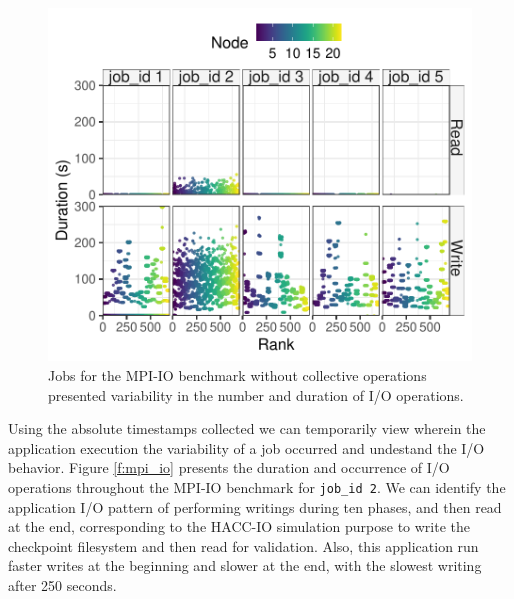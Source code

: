 \begin{figure}
	\centering
        \includegraphics[width=\linewidth]{figs/mpi_io_luster_no_coll_duration_allexperiments.pdf}
	\caption{Jobs for the MPI-IO benchmark without collective
          operations presented variability in the number and duration
          of I/O operations.}
	\label{f:mpi_io_all}
\end{figure}

Using the absolute timestamps collected we can temporarily view
wherein the application execution the variability of a job
occurred and undestand the I/O behavior. Figure \ref{f:mpi_io} presents the duration and occurrence of
I/O operations throughout the MPI-IO benchmark for \texttt{job\_id
  2}. We can identify the application I/O pattern of performing
writings during ten phases, and then read at the end, corresponding to the HACC-IO simulation purpose to write the checkpoint filesystem and then read for validation. Also, this
application run faster writes at the beginning and slower at the end,
with the slowest writing after 250 seconds.
      
